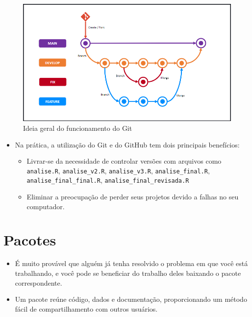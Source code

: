 \documentclass[
  letterpaper,
  DIV=11,
  numbers=noendperiod]{scrartcl}
\begin{document}
\begin{figure}[H]

{\centering \includegraphics[width=1\textwidth,height=\textheight]{Figuras/git_ideia.png}

}

\caption{Ideia geral do funcionamento do Git}

\end{figure}%

\begin{itemize}
\item
  Na prática, a utilização do Git e do GitHub tem dois principais
  benefícios:

  \begin{itemize}
  \item
    Livrar-se da necessidade de controlar versões com arquivos como
    \texttt{analise.R}, \texttt{analise\_v2.R}, \texttt{analise\_v3.R},
    \texttt{analise\_final.R}, \texttt{analise\_final\_final.R},
    \texttt{analise\_final\_revisada.R}
  \item
    Eliminar a preocupação de perder seus projetos devido a falhas no
    seu computador.
  \end{itemize}
\end{itemize}

\section{Pacotes}\label{pacotes}

\begin{itemize}
\item
  É muito provável que alguém já tenha resolvido o problema em que você
  está trabalhando, e você pode se beneficiar do trabalho deles baixando
  o pacote correspondente.
\item
  Um pacote reúne código, dados e documentação, proporcionando um método
  fácil de compartilhamento com outros usuários.
\end{itemize}
\end{document}
